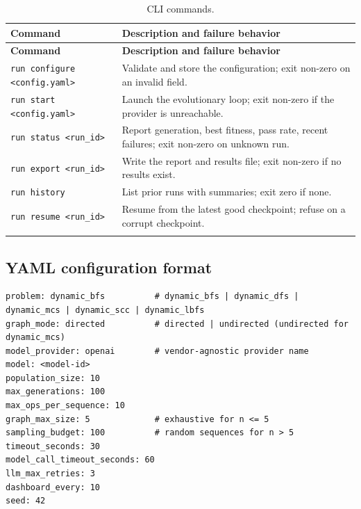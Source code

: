 \documentclass[12pt,a4paper]{article}
\begin{document}
\begin{center}
\footnotesize
\setlength{\tabcolsep}{4pt}
\begin{longtable}{@{}p{4.2cm}p{8.6cm}@{}}
\toprule
\textbf{Command} & \textbf{Description and failure behavior} \\
\midrule
\endfirsthead
\toprule
\textbf{Command} & \textbf{Description and failure behavior} \\
\midrule
\endhead
\bottomrule
\endfoot

\texttt{run configure <config.yaml>} & Validate and store the configuration; exit non-zero on an invalid field. \\
\addlinespace[2pt]
\texttt{run start <config.yaml>} & Launch the evolutionary loop; exit non-zero if the provider is unreachable. \\
\addlinespace[2pt]
\texttt{run status <run\_id>} & Report generation, best fitness, pass rate, recent failures; exit non-zero on unknown run. \\
\addlinespace[2pt]
\texttt{run export <run\_id>} & Write the report and results file; exit non-zero if no results exist. \\
\addlinespace[2pt]
\texttt{run history} & List prior runs with summaries; exit zero if none. \\
\addlinespace[2pt]
\texttt{run resume <run\_id>} & Resume from the latest good checkpoint; refuse on a corrupt checkpoint. \\
\bottomrule
\caption{CLI commands.}
\label{tab:cli}
\end{longtable}
\end{center}

\subsection{YAML configuration format}

\begin{verbatim}
problem: dynamic_bfs          # dynamic_bfs | dynamic_dfs | dynamic_mcs | dynamic_scc | dynamic_lbfs
graph_mode: directed          # directed | undirected (undirected for dynamic_mcs)
model_provider: openai        # vendor-agnostic provider name
model: <model-id>
population_size: 10
max_generations: 100
max_ops_per_sequence: 10
graph_max_size: 5             # exhaustive for n <= 5
sampling_budget: 100          # random sequences for n > 5
timeout_seconds: 30
model_call_timeout_seconds: 60
llm_max_retries: 3
dashboard_every: 10
seed: 42
\end{verbatim}
\end{document}
